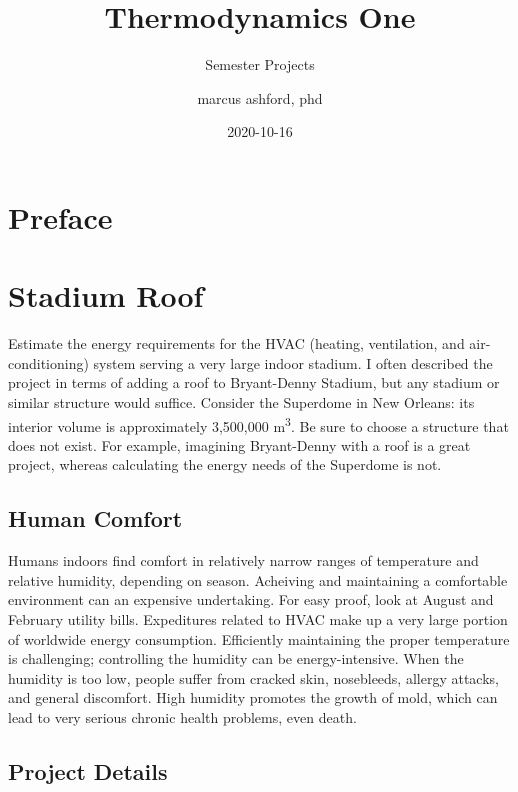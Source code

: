 \documentclass[
]{book}
\title{Thermodynamics One}
\subtitle{Semester Projects}
\author{marcus ashford, phd}
\date{2020-10-16}
\begin{document}
\maketitle

{
\setcounter{tocdepth}{1}
\tableofcontents
}
\hypertarget{preface}{%
\chapter*{Preface}\label{preface}}

\hypertarget{stadium-roof}{%
\chapter{Stadium Roof}\label{stadium-roof}}

Estimate the energy requirements for the HVAC (heating, ventilation, and air-conditioning) system serving a very large indoor stadium. I often described the project in terms of adding a roof to Bryant-Denny Stadium, but any stadium or similar structure would suffice. Consider the Superdome in New Orleans: its interior volume is approximately 3,500,000 m\textsuperscript{3}. Be sure to choose a structure that does not exist. For example, imagining Bryant-Denny with a roof is a great project, whereas calculating the energy needs of the Superdome is not.

\hypertarget{human-comfort}{%
\section{Human Comfort}\label{human-comfort}}

Humans indoors find comfort in relatively narrow ranges of temperature and relative humidity, depending on season. Acheiving and maintaining a comfortable environment can an expensive undertaking. For easy proof, look at August and February utility bills. Expeditures related to HVAC make up a very large portion of worldwide energy consumption. Efficiently maintaining the proper temperature is challenging; controlling the humidity can be energy-intensive. When the humidity is too low, people suffer from cracked skin, nosebleeds, allergy attacks, and general discomfort. High humidity promotes the growth of mold, which can lead to very serious chronic health problems, even death.

\hypertarget{project-details}{%
\section{Project Details}\label{project-details}}
\end{document}
